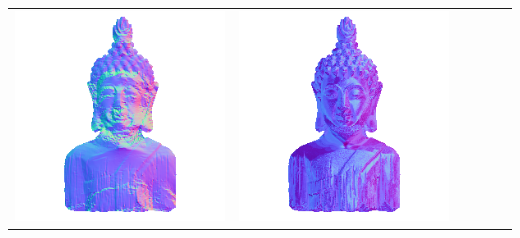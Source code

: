 \begin{tabularx}{\linewidth}{@{}Y@{}Y@{}Y@{}Y@{}Y@{}Y@{}}
\includegraphics[width=\linewidth]{semisynthetic/20160617_16_yu_out.png} &
\includegraphics[width=\linewidth]{semisynthetic/20160617_16_dpsn_out.png} &

\end{tabularx}
